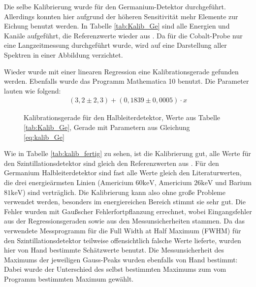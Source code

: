 \documentclass[
	parskip=half,10pt,
	numbers= noenddot, %
	toc=flat, %
	oneside,
	twocolumn,
	]{scrartcl}
\begin{document}
Die selbe Kalibrierung wurde für den Germanium-Detektor durchgeführt. Allerdings konnten hier aufgrund der höheren Sensitivität mehr Elemente zur Eichung benutzt 
werden. In Tabelle \ref{tab:Kalib_Ge} sind alle Energien und Kanäle aufgeführt, die Referenzwerte wieder aus \cite{kohlrausch}. Da für die Cobalt-Probe nur eine 
Langzeitmessung durchgeführt wurde, wird auf eine Darstellung aller Spektren in einer Abbildung verzichtet. 


Wieder wurde mit einer linearen Regression eine Kalibrationsgerade gefunden werden. Ebenfalls wurde das Programm Mathematica 10 benutzt. 
Die Parameter lauten wie folgend:
\begin{align}
(3,2 \pm 2,3) + (0,1839 \pm 0,0005) \cdot x
\label{eq:kalib_Ge}
\end{align}


\begin{figure}[h!]
\begin{center}
\end{center} 
\caption{Kalibrationsgerade für den Halbleiterdetektor, Werte aus Tabelle \ref{tab:Kalib_Ge}, Gerade mit Parametern aus Gleichung \ref{eq:kalib_Ge}}
\label{fig:Kalibrationsgerade_Ge}
\end{figure}

Wie in Tabelle \ref{tab:kalib_fertig} zu sehen, ist die Kalibrierung gut, alle Werte für den Szintillationsdetektor sind gleich den Referenzwerten aus 
\cite{kohlrausch}. Für den Germanium Halbleiterdetektor sind fast alle Werte gleich den Literaturwerten, die drei energieärmsten Linien 
(Americium $60 \si{\kilo \electronvolt}$, Americium $26 \si{\kilo \electronvolt}$ und Barium $81 \si{\kilo \electronvolt}$) sind verträglich. Die Kalibrierung 
kann also ohne große Probleme verwendet werden, besonders im energiereichen Bereich stimmt sie sehr gut. Die Fehler wurden mit Gaußscher Fehlerfortpflanzung 
errechnet, wobei Eingangsfehler aus der Regressionsgeraden sowie aus den Messunsicherheiten stammen. Da das verwendete Messprogramm für die Full Width at 
Half Maximum (FWHM) für den Szintillationsdetektor teilweise offensichtlich falsche Werte lieferte, wurden hier von Hand bestimmte Schätzwerte benutzt. 
Die Messunsicherheit des Maximums der jeweiligen Gauss-Peaks wurden ebenfalls von Hand bestimmt: Dabei wurde der Unterschied des selbst bestimmten Maximums 
zum vom Programm bestimmten Maximum gewählt. 
\end{document}
